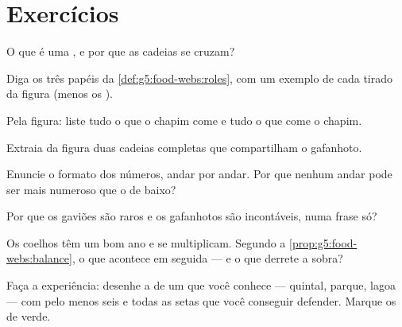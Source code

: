 \section{Exercícios}

\begin{exercise}[$\star$]\label{exo:g5:food-webs:1}
O que é uma , e por que as cadeias se cruzam?
\end{exercise}

\begin{exercise}[$\star$]\label{exo:g5:food-webs:2}
Diga os três papéis da \cref{def:g5:food-webs:roles}, com um exemplo
de cada tirado da figura (menos os ).
\end{exercise}

\begin{exercise}[$\star$]\label{exo:g5:food-webs:3}
Pela figura: liste tudo o que o chapim come e tudo o que come o
chapim.
\end{exercise}

\begin{exercise}[$\star$]\label{exo:g5:food-webs:4}
Extraia da figura duas cadeias completas que compartilham o
gafanhoto.
\end{exercise}

\begin{exercise}[$\star$]\label{exo:g5:food-webs:5}
Enuncie o formato dos números, andar por andar. Por que nenhum andar
pode ser mais numeroso que o de baixo?
\end{exercise}

\begin{exercise}[$\star$]\label{exo:g5:food-webs:6}
Por que os gaviões são raros e os gafanhotos são incontáveis, numa
frase só?
\end{exercise}

\begin{exercise}[$\star$]\label{exo:g5:food-webs:7}
Os coelhos têm um bom ano e se multiplicam. Segundo a
\cref{prop:g5:food-webs:balance}, o que acontece em seguida --- e o
que derrete a sobra?
\end{exercise}

\begin{exercise}[$\star$]\label{exo:g5:food-webs:8}
Faça a experiência: desenhe a  de um  que você
conhece --- quintal, parque, lagoa --- com pelo menos seis  e
todas as setas que você conseguir defender. Marque os  de
verde.
\end{exercise}

